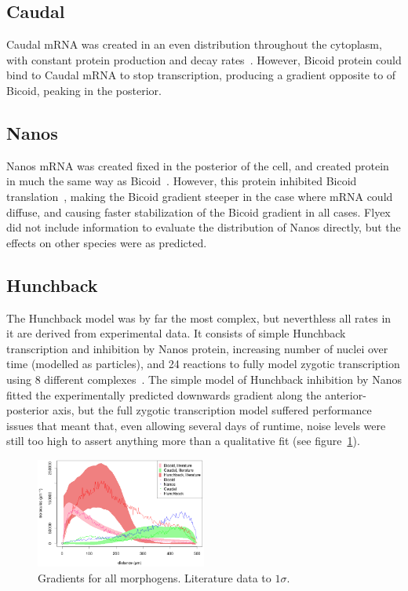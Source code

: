 \documentclass[11pt,a4paper,twocolumn]{article}
\begin{document}
\subsection{Caudal}
Caudal mRNA was created in an even distribution throughout the cytoplasm, with constant protein production and decay rates~\cite{Bergmann2007}. However, Bicoid protein could bind to Caudal mRNA to stop transcription, producing a gradient opposite to of Bicoid, peaking in the posterior.

\subsection{Nanos}
Nanos mRNA was created fixed in the posterior of the cell, and created protein in much the same way as Bicoid~\cite{Kugler2009,Bergmann2007}. However, this protein inhibited Bicoid translation~\cite{Little2011}, making the Bicoid gradient steeper in the case where mRNA could diffuse, and causing faster stabilization of the Bicoid gradient in all cases. Flyex did not include information to evaluate the distribution of Nanos directly, but the effects on other species were as predicted.

\subsection{Hunchback}
The Hunchback model was by far the most complex, but neverthless all rates in it are derived from experimental data. It consists of simple Hunchback transcription and inhibition by Nanos protein, increasing number of nuclei over time (modelled as particles), and 24 reactions to fully model zygotic transcription using 8 different complexes~\cite{Holloway2011}. The simple model of Hunchback inhibition by Nanos fitted the experimentally predicted downwards gradient along the anterior-posterior axis, but the full zygotic transcription model suffered performance issues that meant that, even allowing several days of runtime, noise levels were still too high to assert anything more than a qualitative fit (see figure~\ref{fig:all}).

\begin{figure}[h]
\includegraphics[width=0.5\textwidth]{writeup-all}
\caption{Gradients for all morphogens. Literature data to \(1\sigma\). \label{fig:all}}
\end{figure}
\end{document}
